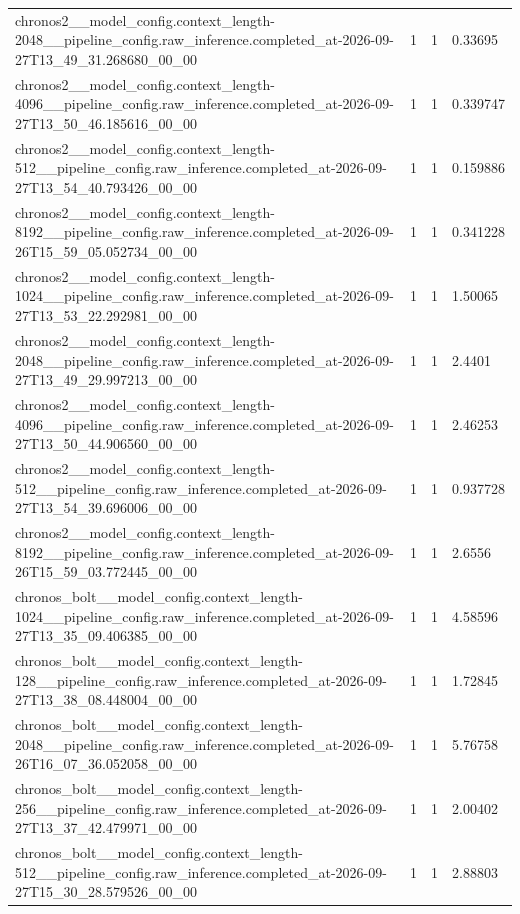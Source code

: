 \begin{tabular}{llll}
chronos2\_\_model\_config.context\_length-2048\_\_pipeline\_config.raw\_inference.completed\_at-2026-09-27T13\_49\_31.268680\_00\_00 & 1 & 1 & 0.33695 \\
chronos2\_\_model\_config.context\_length-4096\_\_pipeline\_config.raw\_inference.completed\_at-2026-09-27T13\_50\_46.185616\_00\_00 & 1 & 1 & 0.339747 \\
chronos2\_\_model\_config.context\_length-512\_\_pipeline\_config.raw\_inference.completed\_at-2026-09-27T13\_54\_40.793426\_00\_00 & 1 & 1 & 0.159886 \\
chronos2\_\_model\_config.context\_length-8192\_\_pipeline\_config.raw\_inference.completed\_at-2026-09-26T15\_59\_05.052734\_00\_00 & 1 & 1 & 0.341228 \\
chronos2\_\_model\_config.context\_length-1024\_\_pipeline\_config.raw\_inference.completed\_at-2026-09-27T13\_53\_22.292981\_00\_00 & 1 & 1 & 1.50065 \\
chronos2\_\_model\_config.context\_length-2048\_\_pipeline\_config.raw\_inference.completed\_at-2026-09-27T13\_49\_29.997213\_00\_00 & 1 & 1 & 2.4401 \\
chronos2\_\_model\_config.context\_length-4096\_\_pipeline\_config.raw\_inference.completed\_at-2026-09-27T13\_50\_44.906560\_00\_00 & 1 & 1 & 2.46253 \\
chronos2\_\_model\_config.context\_length-512\_\_pipeline\_config.raw\_inference.completed\_at-2026-09-27T13\_54\_39.696006\_00\_00 & 1 & 1 & 0.937728 \\
chronos2\_\_model\_config.context\_length-8192\_\_pipeline\_config.raw\_inference.completed\_at-2026-09-26T15\_59\_03.772445\_00\_00 & 1 & 1 & 2.6556 \\
chronos\_bolt\_\_model\_config.context\_length-1024\_\_pipeline\_config.raw\_inference.completed\_at-2026-09-27T13\_35\_09.406385\_00\_00 & 1 & 1 & 4.58596 \\
chronos\_bolt\_\_model\_config.context\_length-128\_\_pipeline\_config.raw\_inference.completed\_at-2026-09-27T13\_38\_08.448004\_00\_00 & 1 & 1 & 1.72845 \\
chronos\_bolt\_\_model\_config.context\_length-2048\_\_pipeline\_config.raw\_inference.completed\_at-2026-09-26T16\_07\_36.052058\_00\_00 & 1 & 1 & 5.76758 \\
chronos\_bolt\_\_model\_config.context\_length-256\_\_pipeline\_config.raw\_inference.completed\_at-2026-09-27T13\_37\_42.479971\_00\_00 & 1 & 1 & 2.00402 \\
chronos\_bolt\_\_model\_config.context\_length-512\_\_pipeline\_config.raw\_inference.completed\_at-2026-09-27T15\_30\_28.579526\_00\_00 & 1 & 1 & 2.88803 \\

\end{tabular}
